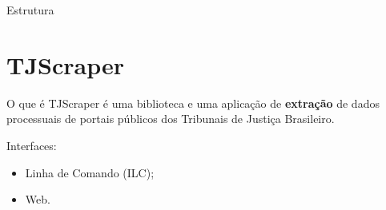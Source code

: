 \begin{frame}{Estrutura}
    \tableofcontents
\end{frame}

\section{TJScraper}

\begin{frame}{O que é}
    TJScraper é uma biblioteca e uma aplicação de \textbf{extração} de dados
    processuais de portais públicos dos Tribunais de Justiça Brasileiro.

    \vspace{1em}

    Interfaces:
    \begin{itemize}
        \item Linha de Comando (ILC);
        \item Web.
    \end{itemize}
\end{frame}

